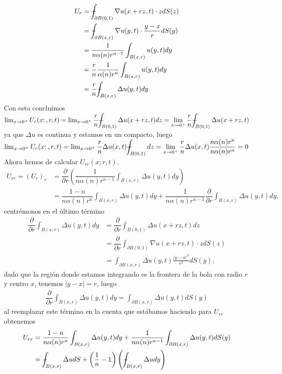 \begin{homeworkProblem}
\begin{solucion}
\begin{align*}
      U_{r} &= \dashint _{\partial B(0,1)}\nabla u (x +rz, t) \cdot z dS(z)\\
      &= \dashint _{\partial B(x,r)} \nabla u(y,t) \cdot \dfrac{y-x}{r} dS(y) \\
      &= \dfrac{1}{n \alpha (n) r^{n-1}} \int _{B(x,r)} u(y,t) dy \\
      &= \dfrac{r}{n} \dfrac{1}{\alpha (n) r^{n}} \int _{B(x,r)} u(y,t) dy \\
      &= \dfrac{r}{n} \dashint _{B(x,r)} \Delta u(y,t) dy \\
    \end{align*}
    Con esto concluimos $\lim_{x \rightarrow 0^{+}} U_{r}(x;,r,t) = \lim_{x \rightarrow 0^{+}} \dfrac{r}{n} \displaystyle \dashint _{B(0,1)} \Delta u(x+rz,t) dz = \lim_{x \rightarrow 0^{+}} \dfrac{r}{n} \displaystyle \dashint _{B(0,1)} \Delta u(x+rz,t)$ ya que $\Delta u$ es continua y estamos en un compacto, luego $\lim_{x \rightarrow 0^{+}} U_{r}(x;,r,t) =\lim_{x \rightarrow 0^{+}} \dfrac{r}{n} \Delta u(x,t) \displaystyle \dashint _{B(0,1)} dz = \lim_{x \rightarrow 0^{+}} \dfrac{r}{n} \Delta u(x,t) \frac{n \alpha (n) r^{n}}{n \alpha (n) r^{n}} = 0$  Ahora hemos de calcular $U_{rr}(x;r,t)$.
    \begin{align*}
      U_{rr} = (U_{r})_{r} &= \dfrac{\partial}{\partial r} \left( \dfrac{1}{n \alpha (n) r^{n-1}} \int _{B(x,r)} \Delta u(y,t)dy \right)\\ 
      &= \dfrac{1-n}{n \alpha (n) r^{n}} \int _{B(x,r)} \Delta u(y,t) dy + \dfrac{1}{n\alpha (n) r^{n-1}} \dfrac{\partial}{\partial r} \int _{B(x,r)} \Delta u(y,t)dy,
    \end{align*}
    centrémonos en el último término
    \begin{align*}
      \dfrac{\partial}{\partial r} \int _{B(x,r)} \Delta u(y,t)dy &= \dfrac{\partial}{\partial r} \int _{B(0,1)} \Delta u(x+rz,t)dz\\ 
      &= \dfrac{\partial}{\partial r} \int _{\partial B(0,1)} \nabla u(x+rz,t) \cdot z dS(z)\\ 
      &= \int _{\partial B(x,r)} \Delta u(y,t) \frac{|y-x|^{2}}{r^{2}} dS(y),
    \end{align*}
    dado que la región donde estamos integrando es la frontera de la bola con radio $r$ y centro $x$, tenemos $|y-x| = r$, luego
    \begin{align*}
      \dfrac{\partial}{\partial r} \int _{B(x,r)} \Delta u(y,t)dy = \int _{\partial B(x,r)} \Delta u(y,t) dS(y)
    \end{align*}
    al reemplazar este término en la cuenta que estábamos haciendo para $U_{rr}$ obtenemos
    \begin{align*}
      U_{rr} &= \dfrac{1-n}{n \alpha (n) r^{n}} \int _{B(x,r)} \Delta u(y,t) dy + \dfrac{1}{n\alpha (n) r^{n-1}} \int _{\partial B(x,r)} \Delta u(y,t) dS(y)\\ 
      &= \dashint _{B(x,r)} \Delta u dS + \left(\dfrac{1}{n} - 1 \right) \left( \dashint _{B(x,r)} \Delta u dy \right)
    \end{align*}
  \end{solucion}
\end{homeworkProblem}
